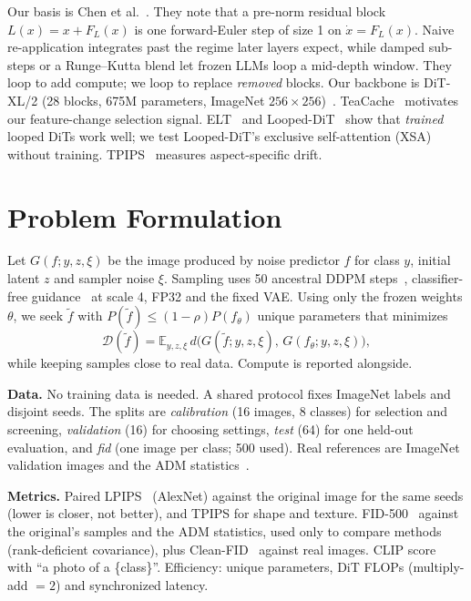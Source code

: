 \documentclass[sigconf,nonacm]{acmart}
\begin{document}
Our basis is Chen et al.~\cite{chen2026looped}. They note that a pre-norm residual block
$L(x)=x+F_L(x)$ is one forward-Euler step of size 1 on $\dot x=F_L(x)$. Naive
re-application integrates past the regime later layers expect, while damped sub-steps or a
Runge--Kutta blend let frozen LLMs loop a mid-depth window. They loop to add compute; we
loop to replace \emph{removed} blocks. Our backbone is DiT-XL/2 (28 blocks, 675M
parameters, ImageNet $256\times256$)~\cite{peebles2023dit}. TeaCache~\cite{liu2025teacache}
motivates our feature-change selection signal. ELT~\cite{goyal2026elt} and
Looped-DiT~\cite{chng2026loopeddit} show that \emph{trained} looped DiTs work well; we test
Looped-DiT's exclusive self-attention (XSA) without training. TPIPS~\cite{wang2026tpips}
measures aspect-specific drift.

\section{Problem Formulation}

Let $G(f;y,z,\xi)$ be the image produced by noise predictor $f$ for class $y$, initial
latent $z$ and sampler noise $\xi$. Sampling uses 50 ancestral DDPM
steps~\cite{ho2020ddpm}, classifier-free guidance~\cite{ho2021cfg} at scale 4, FP32 and
the fixed VAE. Using only the frozen weights $\theta$, we seek $\tilde f$ with
$P(\tilde f)\le(1-\rho)P(f_\theta)$ unique parameters that minimizes
\begin{equation}
  \mathcal D(\tilde f)=\mathbb E_{y,z,\xi}\, d\big(G(\tilde f;y,z,\xi),\,G(f_\theta;y,z,\xi)\big),
\end{equation}
while keeping samples close to real data. Compute is reported alongside.

\textbf{Data.} No training data is needed. A shared protocol fixes ImageNet labels and
disjoint seeds. The splits are \emph{calibration} (16 images, 8 classes) for selection and
screening, \emph{validation} (16) for choosing settings, \emph{test} (64) for one held-out
evaluation, and \emph{fid} (one image per class; 500 used). Real references are ImageNet
validation images and the ADM statistics~\cite{dhariwal2021adm}.

\textbf{Metrics.} Paired LPIPS~\cite{zhang2018lpips} (AlexNet) against the original image
for the same seeds (lower is closer, not better), and TPIPS for shape and texture.
FID-500~\cite{heusel2017fid} against the original's samples and the ADM statistics, used
only to compare methods (rank-deficient covariance), plus Clean-FID~\cite{parmar2022cleanfid}
against real images. CLIP score~\cite{radford2021clip} with ``a photo of a \{class\}''.
Efficiency: unique parameters, DiT FLOPs (multiply-add $=2$) and synchronized latency.
\end{document}
